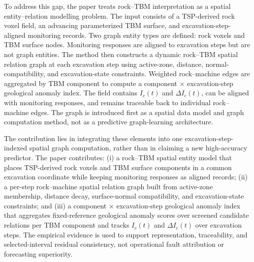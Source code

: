 To address this gap, the paper treats rock--TBM interpretation as a spatial
entity--relation modelling problem. The input consists of a TSP-derived rock
voxel field, an advancing parameterized TBM surface, and
excavation-step-aligned monitoring records. Two graph entity types are defined:
rock voxels and TBM surface nodes. Monitoring responses are aligned to
excavation steps but are not graph entities. The method then constructs a
dynamic rock--TBM spatial relation graph at each excavation step
using active-zone, distance, normal-compatibility, and excavation-state
constraints. Weighted rock--machine edges are aggregated by TBM component to
compute a component $\times$ excavation-step geological anomaly index. The
field contains $I_c(t)$ and $\Delta I_c(t)$, can be aligned with monitoring
responses, and remains traceable back to individual rock--machine edges. The
graph is introduced first as a spatial data model and graph computation
method, not as a predictive graph-learning architecture.

The contribution lies in integrating these elements into one
excavation-step-indexed spatial graph computation, rather than in claiming a
new high-accuracy predictor. The paper contributes: (i) a rock--TBM spatial entity model that
places TSP-derived rock voxels and TBM surface components in a common
excavation coordinate while keeping monitoring responses as aligned records;
(ii) a per-step rock--machine spatial relation graph
built from active-zone membership, distance decay, surface-normal
compatibility, and excavation-state constraints; and (iii) a component
$\times$ excavation-step geological anomaly index that aggregates
fixed-reference geological anomaly scores over screened candidate relations per
TBM component and tracks $I_c(t)$ and $\Delta I_c(t)$ over excavation steps.
The empirical evidence is used to support representation, traceability, and
selected-interval residual consistency, not operational fault attribution or
forecasting superiority.
